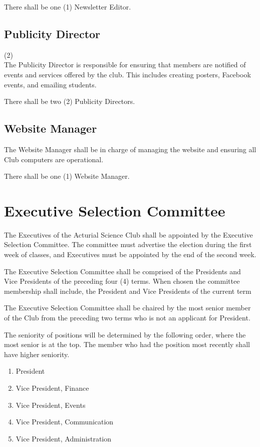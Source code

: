 \documentclass[11pt]{mathsoc}
\begin{document}
There shall be one (1) Newsletter Editor.

\subsection{Publicity Director} (2)\\
The Publicity Director is responsible for ensuring that members are notified 
of events and services offered by the club. This includes creating posters, 
Facebook events, and emailing students. 

There shall be two (2) Publicity Directors.

\subsection{Website Manager} 
The Website Manager shall be in charge of managing the website and ensuring 
all Club computers are operational.

There shall be one (1) Website Manager.

\section{Executive Selection Committee}
The Executives of the Acturial Science Club shall be appointed by the 
Executive Selection Committee. The committee must advertise the election
during the first week of classes, and Executives must be appointed by the end
of the second week.

The Executive Selection Committee shall be comprised of the Presidents and Vice 
Presidents of the preceding four (4) terms. When chosen the committee membership
shall include, the President and Vice Presidents of the current term

The Executive Selection Committee shall be chaired by the most senior member 
of the Club from the preceding two terms who is not an applicant for President.

The seniority of positions will be determined by the following order, where 
the most senior is at the top. The member who had the position most recently 
shall have higher seniority. 

\begin{enumerate}
    \item President
    \item Vice President, Finance
    \item Vice President, Events
    \item Vice President, Communication
    \item Vice President, Administration
\end{enumerate}
\end{document}
